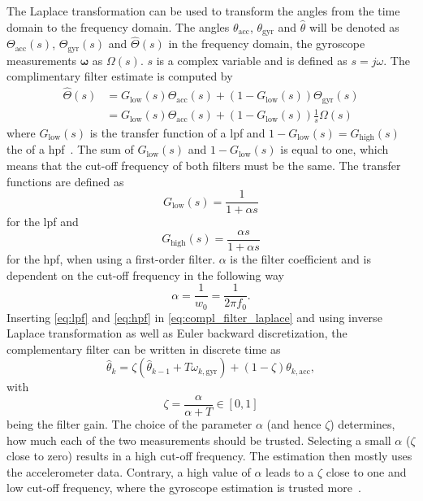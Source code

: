 The Laplace transformation can be used to transform the angles from the time domain to the frequency domain.
The angles $\theta_\mathrm{acc}$, $\theta_\mathrm{gyr}$ and $\hat{\theta}$ will be denoted as $\Theta_\mathrm{acc}(s)$, $\Theta_\mathrm{gyr}(s)$ and $\hat{\Theta}(s)$ in the frequency domain, the gyroscope measurements $\boldsymbol{\omega} $ as $\Omega (s)$.
$s$ is a complex variable and is defined as $s=j\omega$.
The complimentary filter estimate is computed by
\begin{align}
    \label{eq:compl_filter_laplace}
    \hat{\Theta}(s) & = G_\mathrm{low}(s)\Theta_\mathrm{acc}(s) + (1 - G_\mathrm{low}(s))\Theta_\mathrm{gyr}(s) \nonumber \\
                    & = G_\mathrm{low}(s)\Theta_\mathrm{acc}(s) + (1 - G_\mathrm{low}(s))\frac{1}{s}\Omega (s)
\end{align}
where $G_\mathrm{low}(s)$ is the transfer function of a \gls{lpf} and $1-G_\mathrm{low}(s) = G_\mathrm{high}(s)$ the of a \gls{hpf}~\cite{Kok2017}.
The sum of $G_\mathrm{low}(s)$ and $1-G_\mathrm{low}(s)$ is equal to one, which means that the cut-off frequency of both filters must be the same.
The transfer functions are defined as
\begin{equation}
    \label{eq:lpf}
    G_\mathrm{low} (s) = \frac{1}{1 + \alpha s}
\end{equation}
for the \gls{lpf} and
\begin{equation}
    \label{eq:hpf}
    G_\mathrm{high} (s) = \frac{\alpha s}{1 + \alpha s}
\end{equation}
for the \gls{hpf}, when using a first-order filter.
$\alpha$ is the filter coefficient and is dependent on the cut-off frequency in the following way
\begin{equation}
    \alpha
    = \frac{1}{w_0}
    = \frac{1}{2\pi f_0}.
    \label{eq:filter_f0}
\end{equation}
Inserting \cref{eq:lpf} and \cref{eq:hpf} in \cref{eq:compl_filter_laplace} and using inverse Laplace transformation as well as Euler backward discretization, the complementary filter can be written in discrete time as
\begin{equation}
    \hat{\theta}_k = \zeta\left(\hat{\theta}_{k - 1} + T \omega_{k, \mathrm{gyr}}\right) + (1 - \zeta) \theta_{k, \mathrm{acc}},
\end{equation}
with
\begin{equation}
    \label{eq:filter_gain}
    \zeta = \frac{\alpha}{\alpha + T} \in [0,1]
\end{equation}
being the filter gain.
The choice of the parameter $\alpha$ (and hence $\zeta$) determines, how much each of the two measurements should be trusted.
Selecting a small $\alpha$ ($\zeta$ close to zero) results in a high cut-off frequency.
The estimation then mostly uses the accelerometer data.
Contrary, a high value of $\alpha$ leads to a $\zeta$ close to one and low cut-off frequency, where the gyroscope estimation is trusted more~\cite{1997Baerveldt}.


